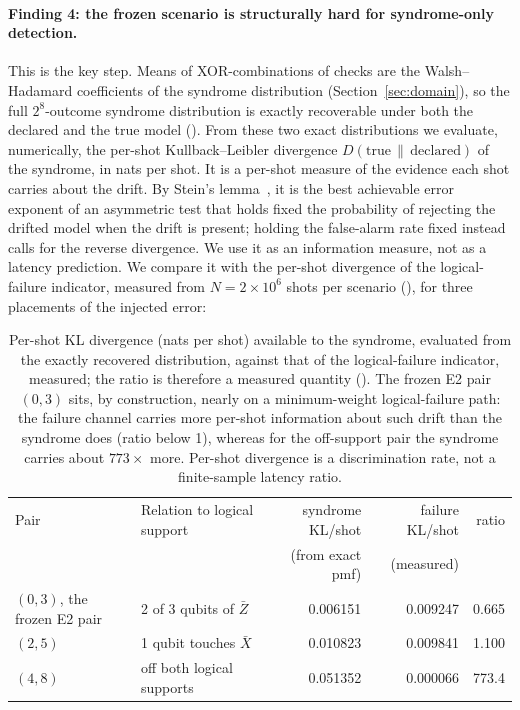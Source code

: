 \paragraph{Finding 4: the frozen scenario is structurally hard for syndrome-only detection.} This is the key step. Means of XOR-combinations of checks are the Walsh--Hadamard coefficients of the syndrome distribution (Section~\ref{sec:domain}), so the full $2^{8}$-outcome syndrome distribution is exactly recoverable under both the declared and the true model (\gExact). From these two exact distributions we evaluate, numerically, the per-shot Kullback--Leibler divergence $D(\mathrm{true}\,\|\,\mathrm{declared})$ of the syndrome, in nats per shot. It is a per-shot measure of the evidence each shot carries about the drift. By Stein's lemma~\cite{cover2006elements}, it is the best achievable error exponent of an asymmetric test that holds fixed the probability of rejecting the drifted model when the drift is present; holding the false-alarm rate fixed instead calls for the reverse divergence. We use it as an information measure, not as a latency prediction. We compare it with the per-shot divergence of the logical-failure indicator, measured from $N = 2 \times 10^{6}$ shots per scenario (\gMeasured), for three placements of the injected error: %

\begin{table}[htbp]
\centering\footnotesize
\setlength{\tabcolsep}{3.5pt}
\begin{tabular}{l l r r r}
\toprule
Pair & Relation to logical support & syndrome KL/shot & failure KL/shot & ratio \\
 & & (from exact pmf) & (measured) & \\
\midrule
$(0,3)$, the frozen E2 pair & 2 of 3 qubits of $\bar{Z}$ & 0.006151 & 0.009247 & 0.665 \\ %
$(2,5)$ & 1 qubit touches $\bar{X}$ & 0.010823 & 0.009841 & 1.100 \\ %
$(4,8)$ & off both logical supports & 0.051352 & 0.000066 & 773.4 \\ %
\bottomrule
\end{tabular}
\caption{Per-shot KL divergence (nats per shot) available to the syndrome, evaluated from the exactly recovered distribution, against that of the logical-failure indicator, measured; the ratio is therefore a measured quantity (\gMeasured). The frozen E2 pair $(0,3)$ sits, by construction, nearly on a minimum-weight logical-failure path: the failure channel carries more per-shot information about such drift than the syndrome does (ratio below 1), whereas for the off-support pair the syndrome carries about $773\times$ more. Per-shot divergence is a discrimination rate, not a finite-sample latency ratio.} %
\label{tab:kl}
\end{table}

